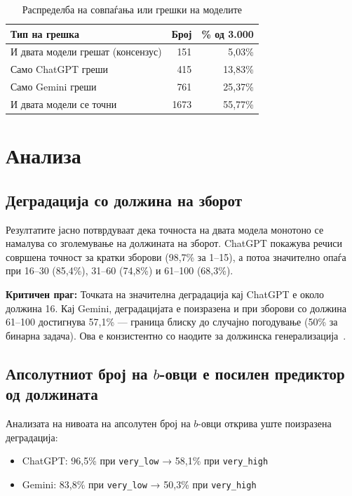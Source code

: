 \documentclass[12pt,a4paper]{article}
\theoremstyle{definition}
\begin{document}
\begin{table}[H]
\centering
\begin{tabular}{lrr}
\toprule
\textbf{Тип на грешка} & \textbf{Број} & \textbf{\% од 3.000} \\
\midrule
И двата модели грешат (консензус)      & 151 & 5,03\% \\
Само ChatGPT греши                      & 415 & 13,83\% \\
Само Gemini греши                       & 761 & 25,37\% \\
И двата модели се точни                 & 1673 & 55,77\% \\
\bottomrule
\end{tabular}
\caption{Распределба на совпаѓања или грешки на моделите}
\end{table}

\section{Анализа}

\subsection{Деградација со должина на зборот}

Резултатите јасно потврдуваат дека точноста на двата модела монотоно се намалува со зголемување на должината на зборот. ChatGPT покажува речиси совршена точност за кратки зборови (98,7\% за 1--15), а потоа значително опаѓа при 16--30 (85,4\%), 31--60 (74,8\%) и 61--100 (68,3\%).

\textbf{Критичен праг:} Точката на значителна деградација кај ChatGPT е около должина 16. Кај Gemini, деградацијата е поизразена и при зборови со должина 61--100 достигнува 57,1\% --- граница блиску до случајно погодување (50\% за бинарна задача). Ова е конзистентно со наодите за должинска генерализација~\cite{anil2022exploring}.

\subsection{Апсолутниот број на $b$-овци е посилен предиктор од должината}

Анализата на нивоата на апсолутен број на $b$-овци открива уште поизразена деградација:

\begin{itemize}
  \item ChatGPT: 96,5\% при \texttt{very\_low} → 58,1\% при \texttt{very\_high}
  \item Gemini: 83,8\% при \texttt{very\_low} → 50,3\% при \texttt{very\_high}
\end{itemize}
\end{document}
